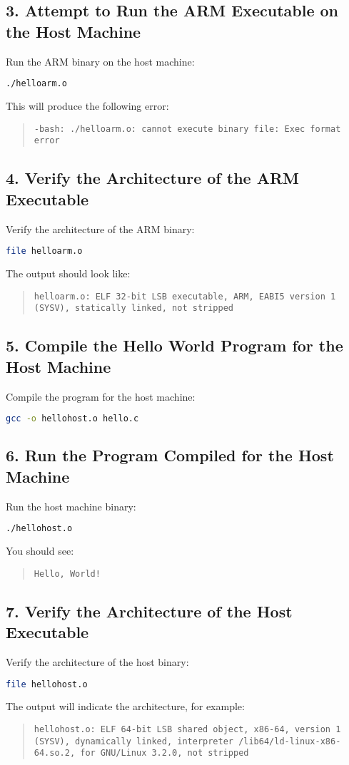 \subsection*{3. Attempt to Run the ARM Executable on the Host Machine}
Run the ARM binary on the host machine:
\begin{lstlisting}[language=bash]
./helloarm.o
\end{lstlisting}
This will produce the following error:
\begin{quote}
\texttt{-bash: ./helloarm.o: cannot execute binary file: Exec format error}
\end{quote}

\subsection*{4. Verify the Architecture of the ARM Executable}
Verify the architecture of the ARM binary:
\begin{lstlisting}[language=bash]
file helloarm.o
\end{lstlisting}
The output should look like:
\begin{quote}
\texttt{helloarm.o: ELF 32-bit LSB executable, ARM, EABI5 version 1 (SYSV), statically linked, not stripped}
\end{quote}

\subsection*{5. Compile the Hello World Program for the Host Machine}
Compile the program for the host machine:
\begin{lstlisting}[language=bash]
gcc -o hellohost.o hello.c
\end{lstlisting}

\subsection*{6. Run the Program Compiled for the Host Machine}
Run the host machine binary:
\begin{lstlisting}[language=bash]
./hellohost.o
\end{lstlisting}
You should see:
\begin{quote}
\texttt{Hello, World!}
\end{quote}

\subsection*{7. Verify the Architecture of the Host Executable}
Verify the architecture of the host binary:
\begin{lstlisting}[language=bash]
file hellohost.o
\end{lstlisting}
The output will indicate the architecture, for example:
\begin{quote}
\texttt{hellohost.o: ELF 64-bit LSB shared object, x86-64, version 1 (SYSV), dynamically linked, interpreter /lib64/ld-linux-x86-64.so.2, for GNU/Linux 3.2.0, not stripped}
\end{quote}

